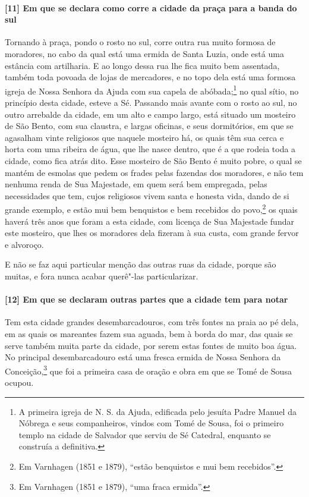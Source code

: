 \paragraph{[11] Em que se declara como corre a cidade da praça para a banda do sul} \quad
Tornando à praça, pondo o rosto no sul, corre outra rua muito formosa de moradores, no
cabo da qual está uma ermida de Santa Luzia, onde está uma estância com artilharia. E ao
longo dessa rua lhe fica muito bem assentada, também toda povoada de lojas de mercadores,
e no topo dela está uma formosa igreja de Nossa Senhora da Ajuda com sua capela de
abóbada;\footnote{ A primeira igreja de N. S. da Ajuda, edificada pelo jesuíta Padre
Manuel da Nóbrega e seus companheiros, vindos com Tomé de Sousa, foi o primeiro templo na
cidade de Salvador que serviu de Sé Catedral, enquanto se construía a definitiva.} no qual
sítio, no princípio desta cidade, esteve a Sé. Passando mais avante com o rosto ao sul, no
outro arrebalde da cidade, em um alto e campo largo, está situado um mosteiro de São
Bento, com sua claustra, e largas oficinas, e seus dormitórios, em que se agasalham vinte
religiosos que naquele mosteiro há, os quais têm sua cerca e horta com uma ribeira de
água, que lhe nasce dentro, que é a que rodeia toda a cidade, como fica atrás dito. Esse
mosteiro de São Bento é muito pobre, o qual se mantém de esmolas que pedem os frades pelas
fazendas dos moradores, e não tem nenhuma renda de Sua Majestade, em quem será bem
empregada, pelas necessidades que tem, cujos religiosos vivem santa e honesta vida, dando
de si grande exemplo, e estão mui bem benquistos e bem recebidos do povo,\footnote{ Em
Varnhagen (1851 e 1879), ``estão benquistos e mui bem recebidos''.} os quais haverá três
anos que foram a esta cidade, com licença de Sua Majestade fundar este mosteiro, que lhes
os moradores dela fizeram à sua custa, com grande fervor e alvoroço.

E não se faz aqui particular menção das outras ruas da cidade, porque são muitas, e fora
nunca acabar querê"-las particularizar.

\paragraph{[12] Em que se declaram outras partes que a cidade tem para notar} \quad
Tem esta cidade grandes desembarcadouros, com três fontes na praia ao pé dela, em as quais
os mareantes fazem sua aguada, bem à borda do mar, das quais se serve também muita parte
da cidade, por serem estas fontes de muito boa água. No principal desembarcadouro está uma
fresca ermida de Nossa Senhora da Conceição,\footnote{ Em Varnhagen (1851 e 1879), ``uma
fraca ermida''.} que foi a primeira casa de oração e obra em que se Tomé de Sousa ocupou.

